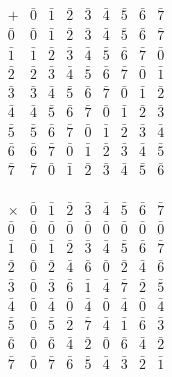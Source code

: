 \vspace{0.3cm}

\noindent
\begin{minipage}{0.48\textwidth}
\[
\begin{array}{c|cccccccc}
+ & \bar{0} & \bar{1} & \bar{2} & \bar{3} & \bar{4} & \bar{5} & \bar{6} & \bar{7} \\
\hline
\bar{0} & \bar{0} & \bar{1} & \bar{2} & \bar{3} & \bar{4} & \bar{5} & \bar{6} & \bar{7} \\
\bar{1} & \bar{1} & \bar{2} & \bar{3} & \bar{4} & \bar{5} & \bar{6} & \bar{7} & \bar{0} \\
\bar{2} & \bar{2} & \bar{3} & \bar{4} & \bar{5} & \bar{6} & \bar{7} & \bar{0} & \bar{1} \\
\bar{3} & \bar{3} & \bar{4} & \bar{5} & \bar{6} & \bar{7} & \bar{0} & \bar{1} & \bar{2} \\
\bar{4} & \bar{4} & \bar{5} & \bar{6} & \bar{7} & \bar{0} & \bar{1} & \bar{2} & \bar{3} \\
\bar{5} & \bar{5} & \bar{6} & \bar{7} & \bar{0} & \bar{1} & \bar{2} & \bar{3} & \bar{4} \\
\bar{6} & \bar{6} & \bar{7} & \bar{0} & \bar{1} & \bar{2} & \bar{3} & \bar{4} & \bar{5} \\
\bar{7} & \bar{7} & \bar{0} & \bar{1} & \bar{2} & \bar{3} & \bar{4} & \bar{5} & \bar{6} \\
\end{array}
\]
\end{minipage}%
\hfill
\begin{minipage}{0.48\textwidth}
\[
\begin{array}{c|cccccccc}
\times & \bar{0} & \bar{1} & \bar{2} & \bar{3} & \bar{4} & \bar{5} & \bar{6} & \bar{7} \\
\hline
\bar{0} & \bar{0} & \bar{0} & \bar{0} & \bar{0} & \bar{0} & \bar{0} & \bar{0} & \bar{0} \\
\bar{1} & \bar{0} & \bar{1} & \bar{2} & \bar{3} & \bar{4} & \bar{5} & \bar{6} & \bar{7} \\
\bar{2} & \bar{0} & \bar{2} & \bar{4} & \bar{6} & \bar{0} & \bar{2} & \bar{4} & \bar{6} \\
\bar{3} & \bar{0} & \bar{3} & \bar{6} & \bar{1} & \bar{4} & \bar{7} & \bar{2} & \bar{5} \\
\bar{4} & \bar{0} & \bar{4} & \bar{0} & \bar{4} & \bar{0} & \bar{4} & \bar{0} & \bar{4} \\
\bar{5} & \bar{0} & \bar{5} & \bar{2} & \bar{7} & \bar{4} & \bar{1} & \bar{6} & \bar{3} \\
\bar{6} & \bar{0} & \bar{6} & \bar{4} & \bar{2} & \bar{0} & \bar{6} & \bar{4} & \bar{2} \\
\bar{7} & \bar{0} & \bar{7} & \bar{6} & \bar{5} & \bar{4} & \bar{3} & \bar{2} & \bar{1} \\
\end{array}
\]
\end{minipage}

\begin{aportes}
    \item {}
\end{aportes}